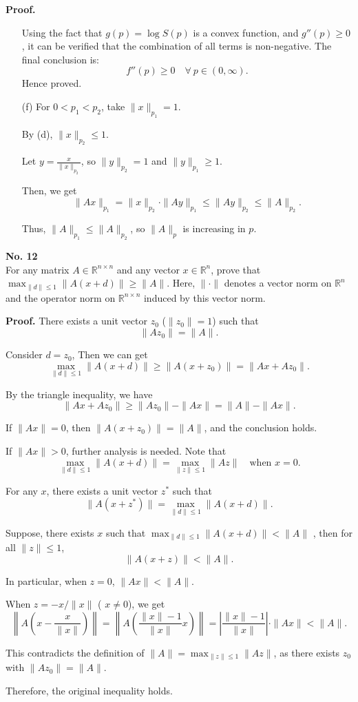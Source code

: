 \documentclass[a4paper, 11pt]{article}
\newenvironment{problem}[2][No.]
    { \begin{mdframed}[backgroundcolor=gray!5] \textbf{#1 #2} \\}
    {  \end{mdframed}}
\newenvironment{solution}
    {\textbf{Proof.}}
    {}
\begin{document}
\begin{solution}
\begin{enumerate}
Using the fact that \( g(p)=\log S(p) \) is a convex function, and \( g''(p)\geq0 \), it can be verified that the combination of all terms is non-negative. The final conclusion is: 
$$
f''(p)\geq0\quad\forall\ p\in(0,\infty).
$$	 	 
Hence proved.
	 	\item[(f)] 
	 For \( 0 < p_1 < p_2 \), take \( \|x\|_{p_1} = 1 \). 
	 
	 By (d), \( \|x\|_{p_2} \leq 1 \). 
	 
	 Let \( y = \frac{x}{\|x\|_{p_2}} \), so \( \|y\|_{p_2} = 1 \) and \( \|y\|_{p_1} \geq 1 \).
	 
	  Then, we get
$$
	 \|Ax\|_{p_1} = \|x\|_{p_2} \cdot \|Ay\|_{p_1} \leq \|Ay\|_{p_2} \leq \|A\|_{p_2}.
$$

	 Thus, \( \|A\|_{p_1} \leq \|A\|_{p_2} \), so \(\|A\|_p\) is increasing in \( p \).
	  \end{enumerate}
\end{solution}

\begin{problem}{12}
	For any matrix \( A \in \mathbb{R}^{n \times n} \) and any vector \( x \in \mathbb{R}^n \), prove that \( \max_{\|d\| \leq 1} \|A(x + d)\| \geq \|A\| \). Here, \( \|\cdot\| \) denotes a vector norm on \( \mathbb{R}^n \) and the operator norm on \( \mathbb{R}^{n \times n} \) induced by this vector norm.
\end{problem}

\begin{solution}
	There exists a unit vector \( z_0 \) (\( \|z_0\| = 1 \)) such that
	$$
	\|Az_0\| = \|A\|.
	$$
	
	Consider  \( d = z_0 \), Then we can get
	$$
	\max_{\|d\| \leq 1} \|A(x + d)\| \geq \|A(x + z_0)\| = \|Ax + Az_0\|.
	$$
	
	By the triangle inequality, we have
	$$
	\|Ax + Az_0\| \geq \|Az_0\| - \|Ax\| = \|A\| - \|Ax\|.
	$$
	
	If \( \|Ax\| = 0 \), then \( \|A(x + z_0)\| = \|A\| \), and the conclusion holds.
	
	If \( \|Ax\| > 0 \), further analysis is needed. Note that
	$$
	\max_{\|d\| \leq 1} \|A(x + d)\| = \max_{\|z\| \leq 1} \|Az\| \quad \text{when } x = 0.
	$$
	
	For any \( x \), there exists a unit vector \( z^* \) such that
	$$
	\|A(x + z^*)\| = \max_{\|d\| \leq 1} \|A(x + d)\|.
	$$
	
	Suppose, there exists \( x \) such that \( \max_{\|d\| \leq 1} \|A(x + d)\| < \|A\| \) , then for all \( \|z\| \leq 1 \),
	$$
	\|A(x + z)\| < \|A\|.
	$$
	
	In particular, when \( z = 0 \), \( \|Ax\| < \|A\| \).
	
	When \( z = -x/\|x\| \) ( \( x \neq 0 \)), we get
	$$
	\left\|A\left(x - \frac{x}{\|x\|}\right)\right\| = \left\|A\left(\frac{\|x\| - 1}{\|x\|} x\right)\right\| = \left|\frac{\|x\| - 1}{\|x\|}\right| \cdot \|Ax\| < \|A\|.
	$$
	
	This contradicts the definition of \( \|A\| = \max_{\|z\| \leq 1} \|Az\| \), as there exists \( z_0 \) with \( \|Az_0\| = \|A\| \). 
	
	Therefore, the original inequality holds.
\end{solution}
\end{document}
